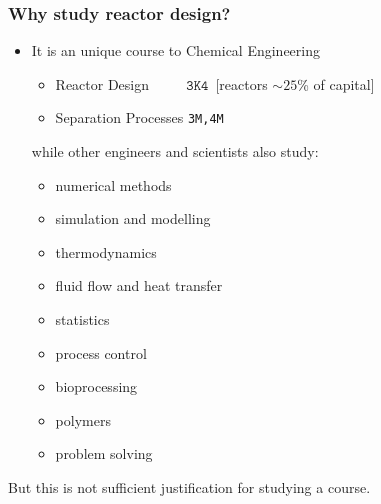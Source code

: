 \begin{frame}\frametitle{Why study reactor design?}
	\begin{itemize}
		\item	It is an unique course to Chemical Engineering
			\begin{itemize}
				\item	Reactor Design $\qquad\,\,\mathtt{3K4}$\qquad\, [reactors $\sim 25$\% of capital]
				\item	Separation Processes \texttt{3M,4M} 
			\end{itemize}
			\vspace{12pt}
			while other engineers and scientists also study:
			\begin{itemize}
				\item	numerical methods
				\item	simulation and modelling
				\item	thermodynamics
				\item	fluid flow and heat transfer
				\item	statistics
				\item	process control
				\item	bioprocessing
				\item	polymers
				\item	problem solving
			\end{itemize}
	\end{itemize}
	But this is not sufficient justification for studying a course.
\end{frame}

